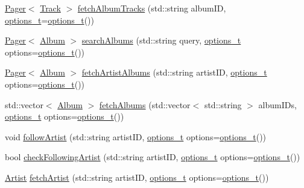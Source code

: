 \begin{DoxyCompactItemize}
\item 
\mbox{\hyperlink{class_pager}{Pager}}$<$ \mbox{\hyperlink{class_track}{Track}} $>$ \mbox{\hyperlink{class_spotify_a_p_i_a3e007d4199f40cd6227613d28319c175}{fetch\+Album\+Tracks}} (std\+::string album\+ID, \mbox{\hyperlink{_spotify_a_p_i_8h_a0ff5cac1a4007bb330b7d9939650c283}{options\+\_\+t}}=\mbox{\hyperlink{_spotify_a_p_i_8h_a0ff5cac1a4007bb330b7d9939650c283}{options\+\_\+t}}())
\item 
\mbox{\hyperlink{class_pager}{Pager}}$<$ \mbox{\hyperlink{class_album}{Album}} $>$ \mbox{\hyperlink{class_spotify_a_p_i_ad0402c961ecee1c579204eb0d1945261}{search\+Albums}} (std\+::string query, \mbox{\hyperlink{_spotify_a_p_i_8h_a0ff5cac1a4007bb330b7d9939650c283}{options\+\_\+t}} options=\mbox{\hyperlink{_spotify_a_p_i_8h_a0ff5cac1a4007bb330b7d9939650c283}{options\+\_\+t}}())
\item 
\mbox{\hyperlink{class_pager}{Pager}}$<$ \mbox{\hyperlink{class_album}{Album}} $>$ \mbox{\hyperlink{class_spotify_a_p_i_a565dbf6b925da78ef7ef355447b61a9f}{fetch\+Artist\+Albums}} (std\+::string artist\+ID, \mbox{\hyperlink{_spotify_a_p_i_8h_a0ff5cac1a4007bb330b7d9939650c283}{options\+\_\+t}} options=\mbox{\hyperlink{_spotify_a_p_i_8h_a0ff5cac1a4007bb330b7d9939650c283}{options\+\_\+t}}())
\item 
std\+::vector$<$ \mbox{\hyperlink{class_album}{Album}} $>$ \mbox{\hyperlink{class_spotify_a_p_i_ac2ec43ab2e207f7422c59f235cb2831f}{fetch\+Albums}} (std\+::vector$<$ std\+::string $>$ album\+I\+Ds, \mbox{\hyperlink{_spotify_a_p_i_8h_a0ff5cac1a4007bb330b7d9939650c283}{options\+\_\+t}} options=\mbox{\hyperlink{_spotify_a_p_i_8h_a0ff5cac1a4007bb330b7d9939650c283}{options\+\_\+t}}())
\item 
void \mbox{\hyperlink{class_spotify_a_p_i_ae8eaa0d40f4a07af6354fac9f0452d47}{follow\+Artist}} (std\+::string artist\+ID, \mbox{\hyperlink{_spotify_a_p_i_8h_a0ff5cac1a4007bb330b7d9939650c283}{options\+\_\+t}} options=\mbox{\hyperlink{_spotify_a_p_i_8h_a0ff5cac1a4007bb330b7d9939650c283}{options\+\_\+t}}())
\item 
bool \mbox{\hyperlink{class_spotify_a_p_i_a87a0c994f9f8349bc59db853224e33af}{check\+Following\+Artist}} (std\+::string artist\+ID, \mbox{\hyperlink{_spotify_a_p_i_8h_a0ff5cac1a4007bb330b7d9939650c283}{options\+\_\+t}} options=\mbox{\hyperlink{_spotify_a_p_i_8h_a0ff5cac1a4007bb330b7d9939650c283}{options\+\_\+t}}())
\item 
\mbox{\hyperlink{class_artist}{Artist}} \mbox{\hyperlink{class_spotify_a_p_i_a6ef5675e1ace89ae83576e424f71c785}{fetch\+Artist}} (std\+::string artist\+ID, \mbox{\hyperlink{_spotify_a_p_i_8h_a0ff5cac1a4007bb330b7d9939650c283}{options\+\_\+t}} options=\mbox{\hyperlink{_spotify_a_p_i_8h_a0ff5cac1a4007bb330b7d9939650c283}{options\+\_\+t}}())

\end{DoxyCompactItemize}
